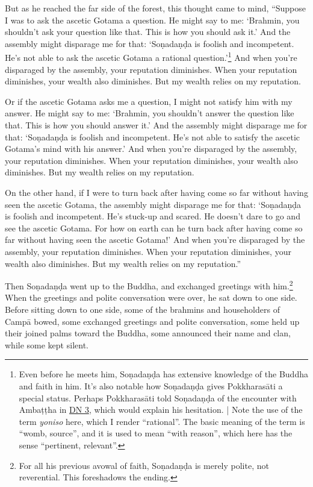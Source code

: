 \documentclass[12pt,openany]{book}%
\begin{document}
But as he reached the far side of the forest, this thought came to mind, “Suppose I was to ask the ascetic Gotama a question. He might say to me: ‘Brahmin, you shouldn’t ask your question like that. This is how you should ask it.’ And the assembly might disparage me for that: ‘\textsanskrit{Soṇadaṇḍa} is foolish and incompetent. He’s not able to ask the ascetic Gotama a rational question.’\footnote{Even before he meets him, \textsanskrit{Soṇadaṇḍa} has extensive knowledge of the Buddha and faith in him. It’s also notable how \textsanskrit{Soṇadaṇḍa} gives \textsanskrit{Pokkharasāti} a special status. Perhaps \textsanskrit{Pokkharasāti} told \textsanskrit{Soṇadaṇḍa} of the encounter with \textsanskrit{Ambaṭṭha} in \href{https://suttacentral.net/dn3/en/sujato}{DN 3}, which would explain his hesitation. | Note the use of the term \textit{yoniso} here, which I render “rational”. The basic meaning of the term is “womb, source”, and it is used to mean “with reason”, which here has the sense “pertinent, relevant”. } And when you’re disparaged by the assembly, your reputation diminishes. When your reputation diminishes, your wealth also diminishes. But my wealth relies on my reputation. 

Or if the ascetic Gotama asks me a question, I might not satisfy him with my answer. He might say to me: ‘Brahmin, you shouldn’t answer the question like that. This is how you should answer it.’ And the assembly might disparage me for that: ‘\textsanskrit{Soṇadaṇḍa} is foolish and incompetent. He’s not able to satisfy the ascetic Gotama’s mind with his answer.’ And when you’re disparaged by the assembly, your reputation diminishes. When your reputation diminishes, your wealth also diminishes. But my wealth relies on my reputation. 

On the other hand, if I were to turn back after having come so far without having seen the ascetic Gotama, the assembly might disparage me for that: ‘\textsanskrit{Soṇadaṇḍa} is foolish and incompetent. He’s stuck-up and scared. He doesn’t dare to go and see the ascetic Gotama. For how on earth can he turn back after having come so far without having seen the ascetic Gotama!’ And when you’re disparaged by the assembly, your reputation diminishes. When your reputation diminishes, your wealth also diminishes. But my wealth relies on my reputation.” 

Then \textsanskrit{Soṇadaṇḍa} went up to the Buddha, and exchanged greetings with him.\footnote{For all his previous avowal of faith, \textsanskrit{Soṇadaṇḍa} is merely polite, not reverential. This foreshadows the ending. } When the greetings and polite conversation were over, he sat down to one side. Before sitting down to one side, some of the brahmins and householders of \textsanskrit{Campā} bowed, some exchanged greetings and polite conversation, some held up their joined palms toward the Buddha, some announced their name and clan, while some kept silent. 
\end{document}
